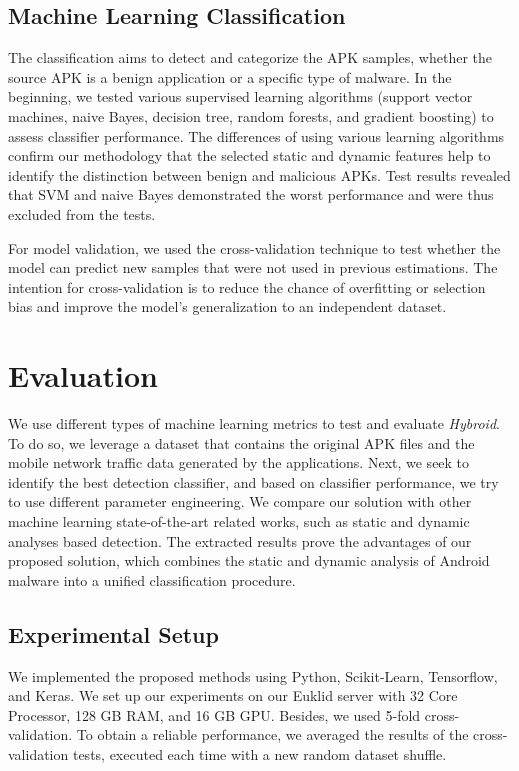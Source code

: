 \documentclass[runningheads]{llncs}
\newcommand{\toolname}{\textit{Hybroid}\xspace}
\begin{document}
\subsection{Machine Learning Classification}

The classification aims to detect and categorize the APK samples, whether the source APK is a benign application or a specific type of malware. In the beginning, we tested various supervised learning algorithms (support vector machines, naive Bayes, decision tree, random forests, and gradient boosting) to assess classifier performance. The differences of using various learning algorithms confirm our methodology that the selected static and dynamic features help to identify the distinction between benign and malicious APKs. Test results revealed that SVM and naive Bayes demonstrated the worst performance and were thus excluded from the tests.

For model validation, we used the cross-validation technique to test whether the model can predict new samples that were not used in previous estimations. The intention for cross-validation is to reduce the chance of overfitting or selection bias and improve the model's generalization to an independent dataset.


\section{Evaluation}

We use different types of machine learning metrics to test and evaluate \toolname. To do so, we leverage a dataset that contains the original APK files and the mobile network traffic data generated by the applications. Next, we seek to identify the best detection classifier, and based on classifier performance, we try to use different parameter engineering. We compare our solution with other machine learning state-of-the-art related works, such as static and dynamic analyses based detection. The extracted results prove the advantages of our proposed solution, which combines the static and dynamic analysis of Android malware into a unified classification procedure.


\subsection{Experimental Setup}

We implemented the proposed methods using Python, Scikit-Learn, Tensorflow, and Keras. We set up our experiments on our Euklid server with 32 Core Processor, 128 GB RAM, and 16 GB GPU. Besides, we used 5-fold cross-validation. To obtain a reliable performance, we averaged the results of the cross-validation tests, executed each time with a new random dataset shuffle.
\end{document}
